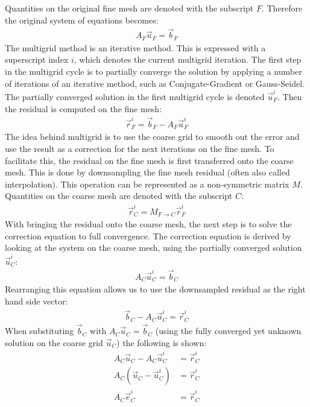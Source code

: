 Quantities on the original fine mesh are denoted with the subscript $F$. Therefore the original system of equations becomes:
\begin{align}
\nonumber
A_F\vec{u}_F = \vec{b}_F
\end{align}
The multigrid method is an iterative method. This is expressed with a superscript index $i$, which denotes the current multigrid iteration. The first step in the multigrid cycle is to partially converge the solution by applying a number of iterations of an iterative method, such as Conjugate-Gradient or Gauss-Seidel. The partially converged solution in the first multigrid cycle is denoted $\vec{u}_F^i$. Then the residual is computed on the fine mesh:
\begin{align}
\nonumber
\vec{r}_F^i = \vec{b}_F-A_F\vec{u}_F^i
\end{align}
The idea behind multigrid is to use the coarse grid to smooth out the error and use the result as a correction for the next iterations on the fine mesh. To facilitate this, the residual on the fine mesh is first transferred onto the coarse mesh. This is done by downsampling the fine mesh residual (often also called interpolation). This operation can be represented as a non-symmetric matrix $M$. Quantities on the coarse mesh are denoted with the subscript $C$:
\begin{align}
\nonumber
\vec{r}_C^i = M_{F\rightarrow C} \vec{r}_F^i
\end{align}
With bringing the residual onto the coarse mesh, the next step is to solve the correction equation to full convergence. The correction equation is derived by looking at the system on the coarse mesh, using the partially converged solution $\vec{u}_C^i$:
\begin{align}
\nonumber
A_C\vec{u}_C^i = \vec{b}_C
\end{align}
Rearranging this equation allows us to use the downsampled residual as the right hand side vector:
\begin{align}
\nonumber
\vec{b}_C - A_C\vec{u}_C^i = \vec{r}_C^i
\end{align}
When substituting $\vec{b}_C$ with $A_C\vec{u}_C=\vec{b}_C$ (using the fully converged yet unknown solution on the coarse grid $\vec{u}_C$) the following is shown:
\begin{align}
A_C\vec{u}_C - A_C\vec{u}_C^i &= \vec{r}_C^i
\nonumber
\\
A_C\left(\vec{u}_C-\vec{u}_C^i\right) &= \vec{r}_C^i
\nonumber
\\
A_C\vec{e}_C^i &= \vec{r}_C^i
\label{eq:da_correction_equation}
\end{align}

